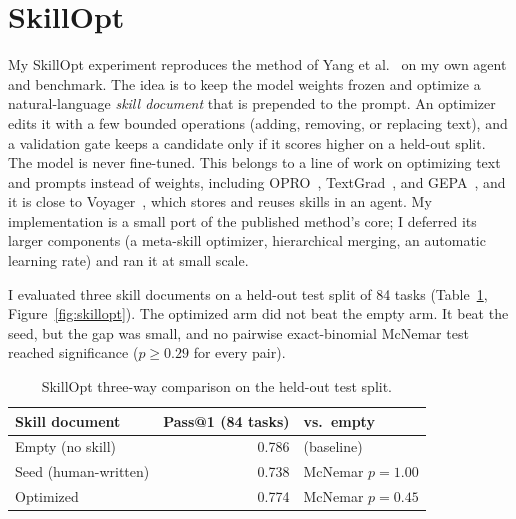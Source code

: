 \documentclass[11pt]{article}
\begin{document}
\section{SkillOpt}
My SkillOpt experiment reproduces the method of Yang et al.~\cite{skillopt} on my own agent and benchmark.
The idea is to keep the model weights frozen and optimize a natural-language \emph{skill document} that is
prepended to the prompt. An optimizer edits it with a few bounded operations (adding, removing, or
replacing text), and a validation gate keeps a candidate only if it scores higher on a held-out split. The
model is never fine-tuned. This belongs to a line of work on optimizing text and prompts instead of
weights, including OPRO~\cite{opro}, TextGrad~\cite{textgrad}, and GEPA~\cite{gepa}, and it is close to
Voyager~\cite{voyager}, which stores and reuses skills in an agent. My implementation is a small port of
the published method's core; I deferred its larger components (a meta-skill optimizer, hierarchical
merging, an automatic learning rate) and ran it at small scale.

I evaluated three skill documents on a held-out test split of 84 tasks (Table~\ref{tab:skillopt},
Figure~\ref{fig:skillopt}). The optimized arm did not beat the empty arm. It beat the seed, but the gap
was small, and no pairwise exact-binomial McNemar test~\cite{mcnemar} reached significance ($p \ge 0.29$
for every pair).

\begin{table}[h]
\centering
\begin{tabular}{lrl}
\toprule
Skill document & Pass@1 (84 tasks) & vs.\ empty \\
\midrule
Empty (no skill)     & 0.786 & (baseline) \\
Seed (human-written) & 0.738 & McNemar $p = 1.00$ \\
Optimized            & 0.774 & McNemar $p = 0.45$ \\
\bottomrule
\end{tabular}
\caption{SkillOpt three-way comparison on the held-out test split.}
\label{tab:skillopt}
\end{table}
\end{document}
